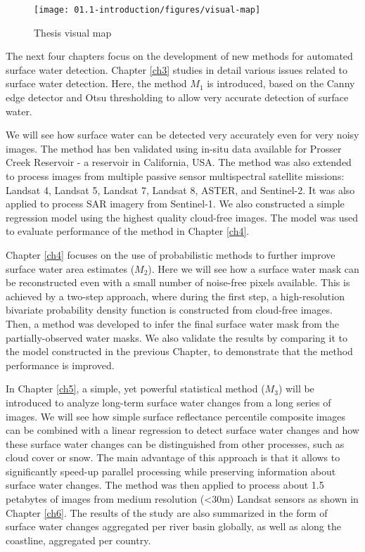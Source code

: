 \begin{figure}[H]
	\texttt{[image: 01.1-introduction/figures/visual-map]}
	\caption{Thesis visual map}
	\label{fig:outline}
\end{figure}

The next four chapters focus on the development of new methods for automated surface water detection. Chapter \ref{ch3} studies in detail various issues related to surface water detection. Here, the method $M_1$ is introduced, based on the Canny edge detector and Otsu thresholding to allow very accurate detection of surface water. 

We will see how surface water can be detected very accurately even for very noisy images. The method has ben validated using in-situ data available for Prosser Creek Reservoir - a reservoir in California, USA. The method was also extended to process images from multiple passive sensor multispectral satellite missions: Landsat 4, Landsat 5, Landsat 7, Landsat 8, ASTER, and Sentinel-2. It was also applied to process \gls{SAR} imagery from Sentinel-1. We also constructed a simple regression model using the highest quality cloud-free images. The model was used to evaluate performance of the method in Chapter \ref{ch4}. 

Chapter \ref{ch4} focuses on the use of probabilistic methods to further improve surface water area estimates ($M_2$). Here we will see how a surface water mask can be reconstructed even with a small number of noise-free pixels available. This is achieved by a two-step approach, where during the first step, a high-resolution bivariate probability density function is constructed from cloud-free images. Then, a method was developed to infer the final surface water mask from the partially-observed water masks. We also validate the results by comparing it to the model constructed in the previous Chapter, to demonstrate that the method performance is improved.

In Chapter \ref{ch5}, a simple, yet powerful statistical method ($M_3$) will be introduced to analyze long-term surface water changes from a long series of images. We will see how simple surface reflectance percentile composite images can be combined with a linear regression to detect surface water changes and how these surface water changes can be distinguished from other processes, such as cloud cover or snow. The main advantage of this approach is that it allows to significantly speed-up parallel processing while preserving information about surface water changes. The method was then applied to process about 1.5 petabytes of images from medium resolution (<30m) Landsat sensors as shown in Chapter \ref{ch6}. The results of the study are also summarized in the form of surface water changes aggregated per river basin globally, as well as along the coastline, aggregated per country.

